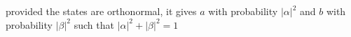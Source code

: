 \documentclass[preview]{standalone}
\begin{document}
\begin{center}
provided the states are orthonormal, it gives $a$ with probability $|\alpha|^2$ and $b$ with probability $|\beta|^2$ such that $|\alpha|^2 + |\beta|^2 = 1$
\end{center}
\end{document}
